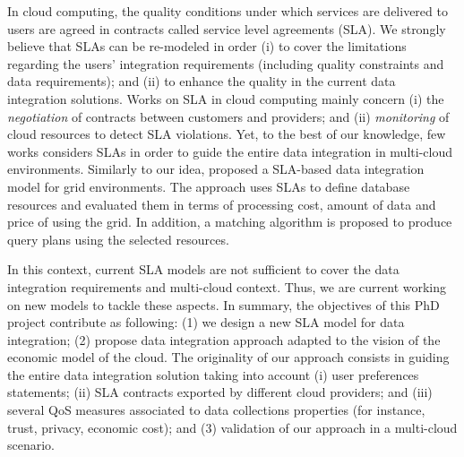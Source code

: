 In cloud computing, the quality conditions under which services are delivered to users are agreed in contracts called service level agreements (SLA). We strongly believe that SLAs can be re-modeled in order (i) to cover the limitations regarding the users' integration requirements (including quality constraints and data requirements); and (ii) to enhance the quality in the current data integration solutions. 
%
Works on SLA in cloud computing mainly concern (i) the \textit{negotiation} of contracts between customers and providers; and (ii) \textit{monitoring} of cloud resources to detect SLA violations.
Yet, to the best of our knowledge, few works considers SLAs in order to guide the entire data integration in multi-cloud environments.
Similarly to our idea, \cite{Nie07} proposed a SLA-based data integration model for grid environments. The approach uses SLAs to define database resources and evaluated them in terms of processing cost, amount of data and price of using the grid. In addition, a matching algorithm is proposed to produce query plans using the selected resources. 


In this context, current SLA models are not sufficient to cover the data integration requirements and multi-cloud context. Thus, we are current working on new models to tackle these aspects. In summary, the objectives of this PhD project contribute as following: (1) we design a new SLA model for data integration; (2) propose data integration approach adapted to the vision of the economic model of the cloud. The originality of our approach consists in guiding the entire data integration solution taking into account (i) user preferences statements; (ii) SLA contracts exported by different cloud providers; and (iii) several QoS measures associated to data collections properties (for instance, trust, privacy, economic cost); and (3) validation of our approach in a multi-cloud scenario.
